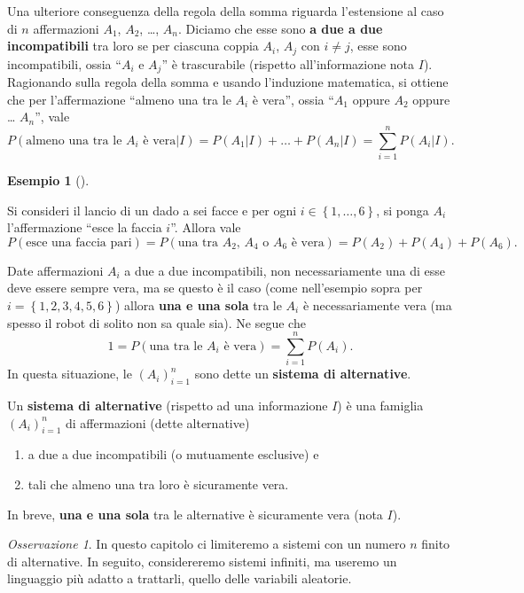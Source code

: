 \documentclass[
  italian,
  letterpaper,
]{book}
\providecommand{\tightlist}{%
  \setlength{\itemsep}{0pt}\setlength{\parskip}{0pt}}
\newcommand{\cur}[1]{\left\{ #1 \right\}}
\theoremstyle{definition}
\newtheorem{example}{Esempio}[chapter]
\theoremstyle{remark}
\newtheorem*{remark}{Osservazione}
\begin{document}
Una ulteriore conseguenza della regola della somma riguarda l'estensione
al caso di \(n\) affermazioni \(A_1\), \(A_2\), \ldots, \(A_n\). Diciamo
che esse sono \textbf{a due a due incompatibili} tra loro se per
ciascuna coppia \(A_i\), \(A_j\) con \(i \neq j\), esse sono
incompatibili, ossia ``\(A_i\) e \(A_j\)'' è trascurabile (rispetto
all'informazione nota \(I\)). Ragionando sulla regola della somma e
usando l'induzione matematica, si ottiene che per l'affermazione
``almeno una tra le \(A_i\) è vera'', ossia ``\(A_1\) oppure \(A_2\)
oppure \ldots{} \(A_n\)'', vale
\[P( \text{almeno una tra le $A_i$ è vera} | I) =  P(A_1|I)+ \ldots + P(A_n|I) = \sum_{i=1}^n P(A_i|I).\]

\begin{example}[]\protect\hypertarget{exm-dado}{}\label{exm-dado}

Si consideri il lancio di un dado a sei facce e per ogni
\(i \in \cur{1, \ldots, 6}\), si ponga \(A_i\) l'affermazione ``esce la
faccia \(i\)''. Allora vale
\[ P( \text{esce una faccia pari}) = P(\text{una tra $A_2$, $A_4$ o $A_6$ è vera}) = P(A_2)+P(A_4)+P(A_6).\]

\end{example}

Date affermazioni \(A_i\) a due a due incompatibili, non necessariamente
una di esse deve essere sempre vera, ma se questo è il caso (come
nell'esempio sopra per \(i=\cur{1,2,3,4,5,6}\)) allora \textbf{una e una
sola} tra le \(A_i\) è necessariamente vera (ma spesso il robot di
solito non sa quale sia). Ne segue che
\[1 = P( \text{una tra le $A_i$ è vera} ) = \sum_{i=1}^n P(A_i).\] In
questa situazione, le \((A_i)_{i=1}^n\) sono dette un \textbf{sistema di
alternative}.

Un \textbf{sistema di alternative} (rispetto ad una informazione \(I\))
è una famiglia \((A_i)_{i=1}^n\) di affermazioni (dette alternative)

\begin{enumerate}
\def\labelenumi{\arabic{enumi}.}
\tightlist
\item
  a due a due incompatibili (o mutuamente esclusive) e
\item
  tali che almeno una tra loro è sicuramente vera.
\end{enumerate}

In breve, \textbf{una e una sola} tra le alternative è sicuramente vera
(nota \(I\)).

\begin{remark}
In questo capitolo ci limiteremo a sistemi con un numero \(n\) finito di
alternative. In seguito, considereremo sistemi infiniti, ma useremo un
linguaggio più adatto a trattarli, quello delle variabili aleatorie.
\end{remark}
\end{document}
